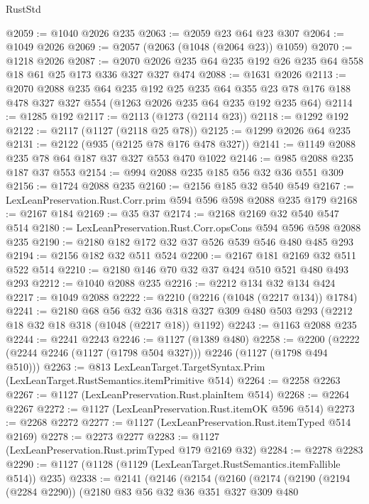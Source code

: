 \begin{lexlean}{RustStd}
\begin{coremodule}
@2059 := @1040 @2026 @235
@2063 := @2059 @23 @64 @23 @307
@2064 := @1049 @2026
@2069 := @2057 (@2063 (@1048 (@2064 @23)) @1059)
@2070 := @1218 @2026
@2087 := @2070 @2026 @235 @64 @235 @192 @26 @235 @64 @558 @18 @61 @25 @173 @336 @327 @327 @474
@2088 := @1631 @2026
@2113 := @2070
    @2088
    @235
    @64
    @235
    @192
    @25
    @235
    @64
    @355
    @23
    @78
    @176
    @188
    @478
    @327
    @327
    @554
    (@1263 @2026 @235 @64 @235 @192 @235 @64)
@2114 := @1285 @192
@2117 := @2113 (@1273 (@2114 @23))
@2118 := @1292 @192
@2122 := @2117 (@1127 (@2118 @25 @78))
@2125 := @1299 @2026 @64 @235
@2131 := @2122 (@935 (@2125 @78 @176 @478 @327))
@2141 := @1149 @2088 @235 @78 @64 @187 @37 @327 @553 @470 @1022
@2146 := @985 @2088 @235 @187 @37 @553
@2154 := @994 @2088 @235 @185 @56 @32 @36 @551 @309
@2156 := @1724 @2088 @235
@2160 := @2156 @185 @32 @540 @549
@2167 := LexLeanPreservation.Rust.Corr.prim @594 @596 @598 @2088 @235 @179
@2168 := @2167 @184
@2169 := @35 @37
@2174 := @2168 @2169 @32 @540 @547 @514
@2180 := LexLeanPreservation.Rust.Corr.opsCons @594 @596 @598 @2088 @235
@2190 := @2180 @182 @172 @32 @37 @526 @539 @546 @480 @485 @293
@2194 := @2156 @182 @32 @511 @524
@2200 := @2167 @181 @2169 @32 @511 @522 @514
@2210 := @2180 @146 @70 @32 @37 @424 @510 @521 @480 @493 @293
@2212 := @1040 @2088 @235
@2216 := @2212 @134 @32 @134 @424
@2217 := @1049 @2088
@2222 := @2210 (@2216 (@1048 (@2217 @134)) @1784)
@2241 := @2180
    @68
    @56
    @32
    @36
    @318
    @327
    @309
    @480
    @503
    @293
    (@2212 @18 @32 @18 @318 (@1048 (@2217 @18)) @1192)
@2243 := @1163 @2088 @235
@2244 := @2241 @2243
@2246 := @1127 (@1389 @480)
@2258 := @2200 (@2222 (@2244 @2246 (@1127 (@1798 @504 @327))) @2246 (@1127 (@1798 @494 @510)))
@2263 := @813 LexLeanTarget.TargetSyntax.Prim (LexLeanTarget.RustSemantics.itemPrimitive @514)
@2264 := @2258 @2263
@2267 := @1127 (LexLeanPreservation.Rust.plainItem @514)
@2268 := @2264 @2267
@2272 := @1127 (LexLeanPreservation.Rust.itemOK @596 @514)
@2273 := @2268 @2272
@2277 := @1127 (LexLeanPreservation.Rust.itemTyped @514 @2169)
@2278 := @2273 @2277
@2283 := @1127 (LexLeanPreservation.Rust.primTyped @179 @2169 @32)
@2284 := @2278 @2283
@2290 := @1127 (@1128 (@1129 (LexLeanTarget.RustSemantics.itemFallible @514)) @235)
@2338 := @2141
    (@2146
      (@2154
        (@2160
          (@2174
            (@2190
              (@2194 (@2284 @2290))
              (@2180
                @83
                @56
                @32
                @36
                @351
                @327
                @309
                @480

\end{coremodule}
\end{lexlean}
